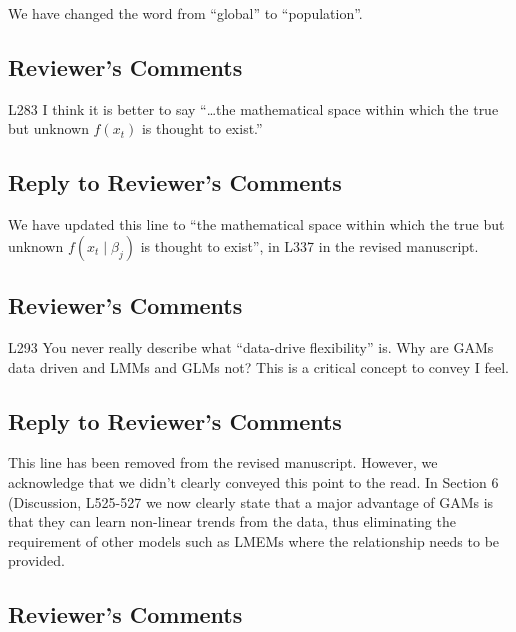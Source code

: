 \documentclass[
]{article}
\begin{document}
We have changed the word from ``global'' to ``population''.

\hypertarget{reviewers-comments-22}{%
\subsection{Reviewer's Comments}\label{reviewers-comments-22}}

L283 I think it is better to say ``\ldots the mathematical space within which the true but unknown \(f(x_t)\) is thought to exist.''

\hypertarget{section-23}{%
\subsection{\texorpdfstring{\textcolor{reviewersblue} {Reply to Reviewer's Comments}}{}}\label{section-23}}

We have updated this line to ``the mathematical space within which the true but unknown \(f(x_t\mid \beta_j)\) is thought to exist'', in L337 in the revised manuscript.

\hypertarget{reviewers-comments-23}{%
\subsection{Reviewer's Comments}\label{reviewers-comments-23}}

L293 You never really describe what ``data-drive flexibility'' is. Why are GAMs data driven and LMMs and GLMs not? This is a critical concept to convey I feel.

\hypertarget{section-24}{%
\subsection{\texorpdfstring{\textcolor{reviewersblue} {Reply to Reviewer's Comments}}{}}\label{section-24}}

This line has been removed from the revised manuscript. However, we acknowledge that we didn't clearly conveyed this point to the read. In Section 6 (Discussion, L525-527 we now clearly state that a major advantage of GAMs is that they can learn non-linear trends from the data, thus eliminating the requirement of other models such as LMEMs where the relationship needs to be provided.

\hypertarget{reviewers-comments-24}{%
\subsection{Reviewer's Comments}\label{reviewers-comments-24}}
\end{document}
